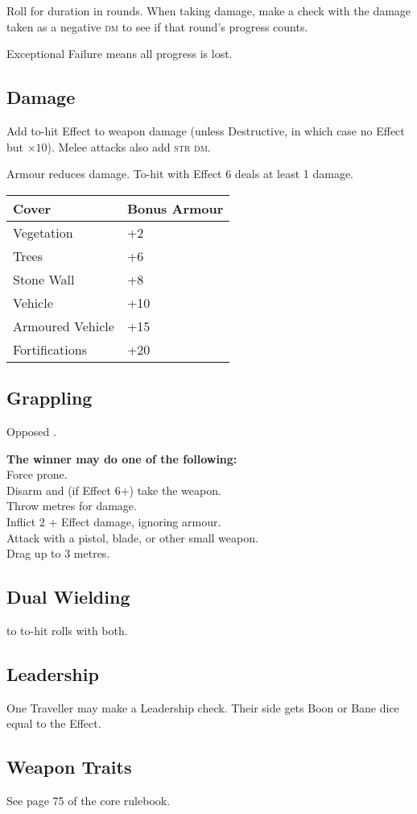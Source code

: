 \documentclass{cheatsheet}
\begin{document}
\begin{multicols}{3}
Roll for duration in rounds.  When taking damage, make a check with
the damage taken as a negative \textsc{dm} to see if that round's
progress counts.

Exceptional Failure means all progress is lost.

\subsection{Damage}

Add to-hit Effect to weapon damage (unless Destructive, in which case
no Effect but $\times 10$).  Melee attacks also add \textsc{str}
\textsc{dm}.

Armour reduces damage.  To-hit with Effect 6 deals at least 1 damage.

\begin{tabularx}{\linewidth}{Xl} \toprule
Cover & Bonus Armour \\ \midrule
Vegetation & +2 \\
Trees & +6 \\
Stone Wall & +8 \\
Vehicle & +10 \\
Armoured Vehicle & +15 \\
Fortifications & +20 \\ \bottomrule
\end{tabularx}

\subsection{Grappling}

Opposed .

\textbf{The winner may do one of the following:}\\
Force prone.\\
Disarm and (if Effect 6+) take the weapon.\\
Throw  metres for  damage.\\
Inflict 2 + Effect damage, ignoring armour.\\
Attack with a pistol, blade, or other small weapon.\\
Drag up to 3 metres.

\subsection{Dual Wielding}

 to to-hit rolls with both.

\subsection{Leadership}

One Traveller may make a Leadership check.  Their side gets Boon or
Bane dice equal to the Effect.

\subsection{Weapon Traits}

See page 75 of the core rulebook.
\end{multicols}
\end{document}
